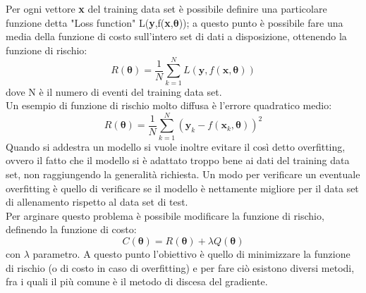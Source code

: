 Per ogni vettore \textbf{x} del training data set è possibile definire una particolare funzione detta "Loss function" L(\textbf{y},f(\textbf{x},$\bm{\theta}$)); a questo punto è possibile fare una media della funzione di costo sull'intero set di dati a disposizione, ottenendo la funzione di rischio: \\
\begin{equation}
	R(\bm{\theta}) = \frac{1}{N}\sum_{k=1}^{N}L(\textbf{y},f(\textbf{x},\bm{\theta}))
\end{equation}
dove N è il numero di eventi del training data set. \\
Un esempio di funzione di rischio molto diffusa è l'errore quadratico medio:
\begin{equation}
	R(\bm{\theta}) = \frac{1}{N}\sum_{k=1}^{N}(\textbf{y}_k - f(\textbf{x}_k , \bm{\theta}))^2
\end{equation}
Quando si addestra un modello si vuole inoltre evitare il così detto overfitting, ovvero il fatto che il modello si è adattato troppo bene ai dati del training data set, non raggiungendo la generalità richiesta. Un modo per verificare un eventuale overfitting è quello di verificare se il modello è nettamente migliore per il data set di allenamento rispetto al data set di test. \\
Per arginare questo problema è possibile modificare la funzione di rischio, definendo la funzione di costo:
\begin{equation}
	C(\bm{\theta}) = R(\bm{\theta}) + \lambda Q(\bm{\theta})
\end{equation}
con $\lambda$ parametro.
A questo punto l'obiettivo è quello di minimizzare la funzione di rischio (o di costo in caso di overfitting) e per fare ciò esistono diversi metodi, fra i quali il più comune è il metodo di discesa del gradiente.

\newpage

